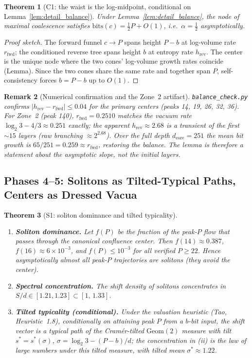 \documentclass[12pt,a4paper]{article}
\newtheorem{theorem}{Theorem}[section]
\newtheorem{remark}[theorem]{Remark}
\begin{document}
\begin{theorem}[C1: the waist is the log-midpoint, conditional on
Lemma~\ref{lem:detail_balance}]
\label{thm:C1}
Under Lemma~\ref{lem:detail_balance}, the node of maximal coalescence satisfies
$\mathrm{bits}(c)=\tfrac12 P+O(1)$, i.e.\ $\alpha=\tfrac12$ asymptotically.
\end{theorem}

\begin{proof}[Proof sketch]
The forward funnel $c\to P$ spans height $P-b$ at log-volume rate $r_{\mathrm{fwd}}$;
the conditioned reverse tree spans height $b$ at entropy rate $h_{\mathrm{rev}}$. The
center is the unique node where the two cones' log-volume growth rates coincide
(Lemma). Since the two cones share the same rate and together span $P$, self-consistency
forces $b=P-b$ up to $O(1)$.
\end{proof}

\begin{remark}[Numerical confirmation and the Zone~2 artifact]
\texttt{balance\_check.py} confirms $|h_{\mathrm{rev}}-r_{\mathrm{fwd}}|\le0.04$ for the
primary centers (peaks 14, 19, 26, 32, 36). For Zone~2 (peak 140),
$r_{\mathrm{fwd}}=0.2510$ matches the vacuum rate $\log_2 3-4/3\approx0.251$ exactly; the
apparent $h_{\mathrm{rev}}\approx2.68$ is a transient of the first $\sim15$ layers (raw
branching $\approx2^{2.68}$). Over the full depth $d_{\mathrm{core}}=251$ the mean bit
growth is $65/251=0.259\approx r_{\mathrm{fwd}}$, restoring the balance. The lemma is
therefore a statement about the \emph{asymptotic} slope, not the initial layers.
\end{remark}
\subsection{Phases 4--5: Solitons as Tilted-Typical Paths, Centers as Dressed Vacua}

\begin{theorem}[S1: soliton dominance and tilted typicality]
\label{thm:S1}
\begin{enumerate}
\item[(i)] \textbf{Soliton dominance.} Let $f(P)$ be the fraction of the peak-$P$
flow that passes through the canonical confluence center. Then
$f(14)\approx0.387$, $f(16)\approx6\times10^{-3}$, and $f(P)\le10^{-3}$ for all
verified $P\ge22$. Hence asymptotically almost all peak-$P$ trajectories are
solitons (they avoid the center).
\item[(ii)] \textbf{Spectral concentration.} The shift density of solitons concentrates
in $S/d\in[1.21,1.23]\subset[1,\,1.33]$.
\item[(iii)] \textbf{Tilted typicality (conditional).} Under the valuation heuristic
(Tao, Heuristic~1.8), conditionally on attaining peak $P$ from a $b$-bit input, the
shift vector is a typical path of the Cram\'er-tilted $\mathrm{Geom}(2)$ measure with
tilt $s^*=s^*(\sigma)$, $\sigma=\log_2 3-(P-b)/d$; the concentration in (ii) is the
law of large numbers under this tilted measure, with tilted mean $\sigma^*\approx1.22$.
\end{enumerate}
\end{theorem}
\end{document}
